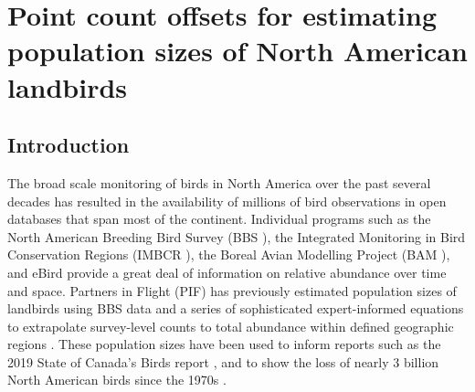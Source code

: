 \chapter{Point count offsets for estimating population sizes of North American landbirds}


\section{Introduction}
\par The broad scale monitoring of birds in North America over the past several decades has resulted in the availability of millions of bird observations in open databases that span most of the continent. Individual programs such as the North American Breeding Bird Survey (BBS \citep{hudson_role_2017, sauer_first_2017}), the Integrated Monitoring in Bird Conservation Regions (IMBCR \citep{pavlacky_statistically_2017}), the Boreal Avian Modelling Project (BAM \citep{cumming_toward_2010}), and eBird \citep{sullivan_ebird_2014} provide a great deal of information on relative abundance over time and space. Partners in Flight (PIF) has previously estimated population sizes of landbirds using BBS data and a series of sophisticated expert-informed equations to extrapolate survey-level counts to total abundance within defined geographic regions \citep{rosenberg_setting_2005, will_handbook_2020}. These population sizes have been used to inform reports such as the 2019 State of Canada’s Birds report \citep{north_american_bird_conservation_initiative_canada_state_2019}, and to show the loss of nearly 3 billion North American birds since the 1970s \citep{rosenberg_decline_2019}.

